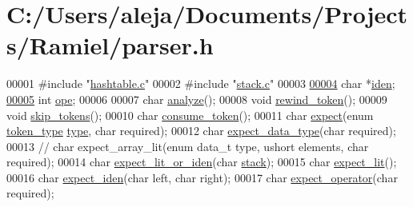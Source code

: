 \hypertarget{parser_8h_source}{}\section{C\+:/\+Users/aleja/\+Documents/\+Projects/\+Ramiel/parser.h}

\begin{DoxyCode}
00001 \textcolor{preprocessor}{#include "\mbox{\hyperlink{hashtable_8c}{hashtable.c}}"}
00002 \textcolor{preprocessor}{#include "\mbox{\hyperlink{stack_8c}{stack.c}}"}
00003 
\mbox{\hyperlink{parser_8h_a92510da84feeae721d37072fa91b350b}{00004}} \textcolor{keywordtype}{char} *\mbox{\hyperlink{parser_8h_a92510da84feeae721d37072fa91b350b}{iden}};
\mbox{\hyperlink{parser_8h_a85f564232fa9eb864bf2c69e5c4fc124}{00005}} \textcolor{keywordtype}{int} \mbox{\hyperlink{parser_8h_a85f564232fa9eb864bf2c69e5c4fc124}{ope}};
00006 
00007 \textcolor{keywordtype}{char} \mbox{\hyperlink{parser_8h_ab8e262381abb5c1e8f9f60852381b46b}{analyze}}();
00008 \textcolor{keywordtype}{void} \mbox{\hyperlink{parser_8h_af0e71bcb4174649d6bbeacd85f541a0c}{rewind\_token}}();
00009 \textcolor{keywordtype}{void} \mbox{\hyperlink{parser_8h_af28390e9a9a85304112b885d17309ccd}{skip\_tokens}}();
00010 \textcolor{keywordtype}{char} \mbox{\hyperlink{parser_8h_aef9ddda616297a42c549608a2182293a}{consume\_token}}();
00011 \textcolor{keywordtype}{char} \mbox{\hyperlink{parser_8h_af7dc467eed15caf818332c1b225e4d51}{expect}}(\textcolor{keyword}{enum} \mbox{\hyperlink{tokens_8c_afe5ef662303b6b710ea6ee1a944bad0d}{token\_type}} \mbox{\hyperlink{structht__item_a0c6169f5c94682132bbbe974784559e6}{type}}, \textcolor{keywordtype}{char} required);
00012 \textcolor{keywordtype}{char} \mbox{\hyperlink{parser_8h_a9ff93d577df1415857dfba2c3959da84}{expect\_data\_type}}(\textcolor{keywordtype}{char} required);
00013 \textcolor{comment}{// char expect\_array\_lit(enum data\_t type, ushort elements, char required);}
00014 \textcolor{keywordtype}{char} \mbox{\hyperlink{parser_8h_a9f0e4ae8bffd096605ec27a3c90ec51e}{expect\_lit\_or\_iden}}(\textcolor{keywordtype}{char} \mbox{\hyperlink{structstack}{stack}});
00015 \textcolor{keywordtype}{char} \mbox{\hyperlink{parser_8h_af9a8c2686d508b84e7ecdc0bef925812}{expect\_lit}}();
00016 \textcolor{keywordtype}{char} \mbox{\hyperlink{parser_8h_a2644e22300d855b464dc9b1a74e2ca23}{expect\_iden}}(\textcolor{keywordtype}{char} left, \textcolor{keywordtype}{char} right);
00017 \textcolor{keywordtype}{char} \mbox{\hyperlink{parser_8h_ae105b811c4f03fbab3d1901ca031ce6c}{expect\_operator}}(\textcolor{keywordtype}{char} required);

\end{DoxyCode}
